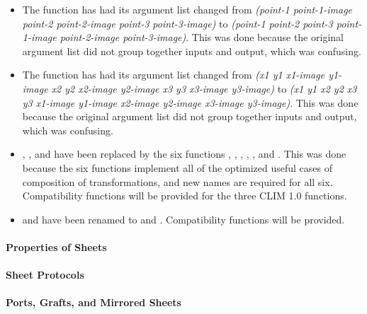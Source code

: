 \begin{itemize}
\item The function  has had its argument list
changed from {\it (point-1 point-1-image point-2 point-2-image point-3 point-3-image)}
to {\it (point-1 point-2 point-3 point-1-image point-2-image point-3-image)}.
This was done because the original argument list did not group together inputs
and output, which was confusing.

\item The function  has had its argument list
changed from {\it (x1 y1 x1-image y1-image x2 y2 x2-image y2-image x3 y3 x3-image y3-image)}
to {\it (x1 y1 x2 y2 x3 y3 x1-image y1-image x2-image y2-image x3-image y3-image)}.
This was done because the original argument list did not group together inputs
and output, which was confusing.

\item {}, , and
 have been replaced by the six functions
, ,
, ,
, and .
This was done because the six functions implement all of the optimized useful
cases of composition of transformations, and new names are required for all six.
Compatibility functions will be provided for the three CLIM 1.0 functions.

\item {} and  have been renamed to
 and .  Compatibility functions
will be provided.
\end{itemize}


\paragraph {Properties of Sheets}


\paragraph {Sheet Protocols}


\paragraph {Ports, Grafts, and Mirrored Sheets}



